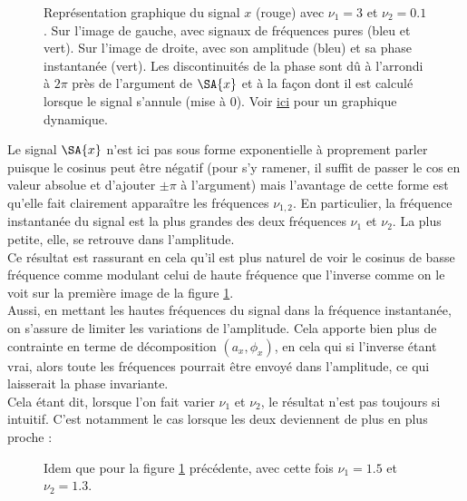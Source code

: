 \begin{figure}[h]\centering
	\caption{Représentation graphique du signal $x$ (rouge) avec $\nu_1=3$ et $\nu_2=0.1$. Sur l'image de gauche, avec signaux de fréquences pures (bleu et vert). Sur l'image de droite, avec son amplitude (bleu) et sa phase instantanée (vert). Les discontinuités de la phase sont dû à l'arrondi à $2\pi$  près de l'argument de $\SA{x}$ et à la façon dont il est calculé lorsque le signal s'annule (mise à 0). Voir \href{https://www.desmos.com/calculator/gcedcdfkhr}{ici} pour un graphique dynamique.}
	\label{fig:exemple_tSA_1/2}
\end{figure}
\noindent
Le signal $\SA{x}$ n'est ici pas sous forme exponentielle à proprement parler puisque le cosinus peut être négatif (pour s'y ramener, il suffit de passer le cos en valeur absolue et d'ajouter $\pm\pi$ à l'argument) mais l’avantage de cette forme est qu'elle fait clairement apparaître les fréquences $\nu_{1,2}$. En particulier, la fréquence instantanée du signal est la plus grandes des deux fréquences $\nu_1$ et $\nu_2$. La plus petite, elle, se retrouve dans l'amplitude. 
\\
Ce résultat est rassurant en cela qu'il est plus naturel de voir le cosinus de basse fréquence comme modulant celui de haute fréquence que l'inverse comme on le voit sur la première image de la figure \ref{fig:exemple_tSA_1/2}. 
\\
Aussi, en mettant les hautes fréquences du signal dans la fréquence instantanée, on s'assure de limiter les variations de l'amplitude. Cela apporte bien plus de contrainte en terme de décomposition $(a_x,\phi_x)$, en cela qui si l'inverse étant vrai, alors toute les fréquences pourrait être envoyé dans l'amplitude, ce qui laisserait la phase invariante.
\\

Cela étant dit, lorsque l'on fait varier $\nu_1$ et $\nu_2$, le résultat n'est pas toujours si intuitif. C'est notamment le cas lorsque les deux deviennent de plus en plus proche :

\begin{figure}[h]\centering
	\caption{Idem que pour la figure \ref{fig:exemple_tSA_1/2} précédente, avec cette fois $\nu_1=1.5$ et $\nu_2=1.3$.}
	\label{fig:exemple_tSA_2/2}
\end{figure}

